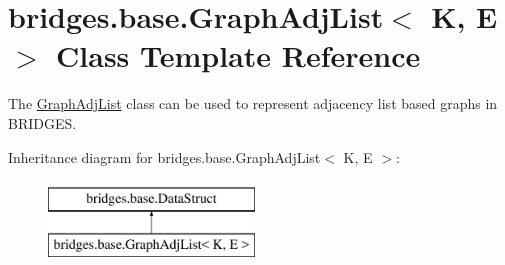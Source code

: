 \hypertarget{classbridges_1_1base_1_1_graph_adj_list}{}\section{bridges.\+base.\+Graph\+Adj\+List$<$ K, E $>$ Class Template Reference}
\label{classbridges_1_1base_1_1_graph_adj_list}


The \hyperlink{classbridges_1_1base_1_1_graph_adj_list}{Graph\+Adj\+List} class can be used to represent adjacency list based graphs in B\+R\+I\+D\+G\+ES.  


Inheritance diagram for bridges.\+base.\+Graph\+Adj\+List$<$ K, E $>$\+:\begin{figure}[H]
\begin{center}
\leavevmode
\includegraphics[height=2.000000cm]{classbridges_1_1base_1_1_graph_adj_list}
\end{center}
\end{figure}

